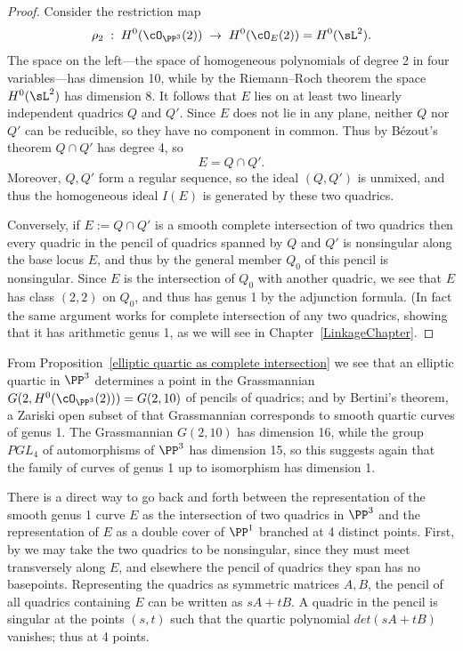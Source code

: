 \begin{proof}
Consider the restriction map
$$
\rho_2 \;  : \; H^0(\cO_{\PP^3}(2)) \; \to \; H^0(\cO_{E}(2)) = H^0(\sL^2).
$$
The space on the left---the space of homogeneous polynomials of degree 2 in four variables---has dimension 10, while by the Riemann--Roch theorem the space $H^0(\sL^2)$ has dimension 8. It follows that $E$ lies on at least two linearly independent quadrics $Q$ and $Q'$. Since $E$ does not lie in any plane, neither $Q$ nor $Q'$ can be reducible, so they have no component in common.
Thus by 
B\'ezout's theorem
%
$Q \cap Q' $ has degree 4, so
$$
E =Q \cap Q'.
$$
Moreover, $Q,Q'$ form a regular sequence, so the ideal $(Q,Q')$ is unmixed, and thus the homogeneous ideal $I(E)$ is generated by
these two quadrics. 

Conversely, if $E := Q\cap Q'$ is a smooth complete intersection of two quadrics then  every quadric in the pencil of quadrics
spanned by $Q$ and $Q'$ is nonsingular along the base locus $E$, and
thus by 
%
the general member $Q_0$ of this
pencil is nonsingular. Since $E$ is the intersection of $Q_0$ with another quadric, we see that $E$ has class $(2,2)$ on $Q_0$,
and thus has genus 1 by the adjunction formula. (In fact the same argument works for complete intersection of any two quadrics,
showing that it has arithmetic genus 1, as we will see in Chapter~\ref{LinkageChapter}.
\end{proof}

From Proposition~\ref{elliptic quartic as complete intersection} we see that an elliptic quartic in $\PP^3$
determines a point in the Grassmannian $G(2, H^0(\cO_{\PP^3}(2))) = G(2, 10)$ of pencils of quadrics; and by Bertini's theorem, a Zariski open subset of that Grassmannian corresponds to smooth quartic curves of genus 1. The Grassmannian $G(2,10)$ has dimension 16, while the group $PGL_4$ of automorphisms of $\PP^3$ has dimension 15, so this suggests again that the family of curves of genus 1 up to isomorphism has dimension 1.

There is a direct way to go back and forth between the representation of the smooth genus 1 curve $E$ as the intersection of two quadrics in $\PP^3$ and the representation of $E$ as a double cover
of $\PP^1$ branched at 4 distinct points. First, by 
%
we may take the two quadrics to be nonsingular, since they must meet
transversely along $E$, and elsewhere the
pencil of quadrics they span has no basepoints. Representing the quadrics as symmetric matrices $A,B$, the pencil of all quadrics containing $E$ can be 
written as $sA+tB$. A quadric in the pencil is singular at the points $(s,t)$ such that the quartic polynomial $det(sA+tB)$ vanishes; thus at 4 points.

